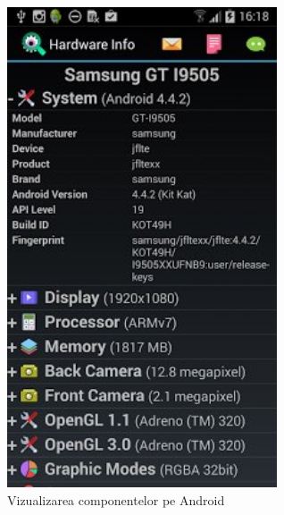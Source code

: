 \begin{figure}[!htbp]
	\centering
	\includegraphics[width=8cm]{chapters/08-hw/img/android-img.png}
	\caption{Vizualizarea componentelor pe Android}
	\label{fig:hw-android}
\end{figure}
